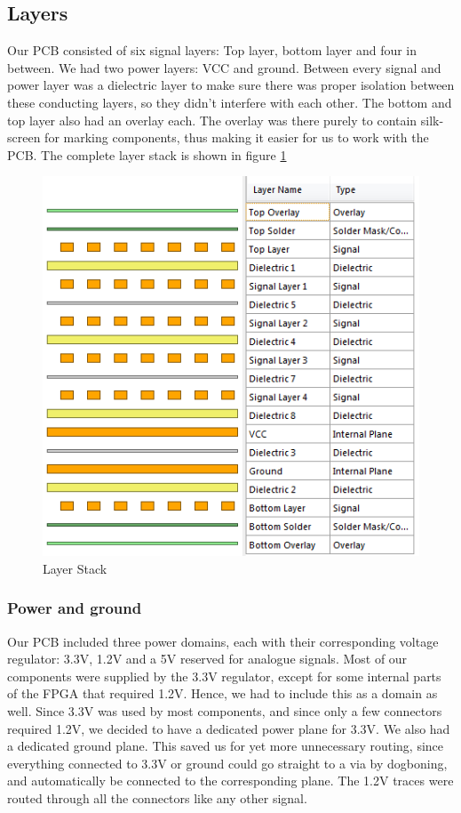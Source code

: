 \subsection{Layers}
Our PCB consisted of six signal layers: Top layer, bottom layer and four in between. We had two power layers: VCC and ground.
\newline
Between every signal and power layer was a dielectric layer to make sure there was proper isolation between these conducting layers, so they didn't interfere with each other.
\newline
The bottom and top layer also had an overlay each. The overlay was there purely to contain silk-screen for marking components, thus making it easier for us to work with the PCB.
\newline
The complete layer stack is shown in figure \ref{fig:Layers}

\begin{figure}[h!]
\centering
\includegraphics[scale = 0.8]{images/Layers.png}
\caption{Layer Stack}
\label{fig:Layers}
\end{figure}

\subsubsection{Power and ground}
Our PCB included three power domains, each with their corresponding voltage regulator: 3.3V, 1.2V and a 5V reserved for analogue signals. Most of our components were supplied by the 3.3V regulator, except for some internal parts of the FPGA that required 1.2V. Hence, we had to include this as a domain as well. 
\newline
\newline
Since 3.3V was used by most components, and since only a few connectors required 1.2V, we decided to have a dedicated power plane for 3.3V. We also had a dedicated ground plane. This saved us for yet more unnecessary routing, since everything connected to 3.3V or ground could go straight to a via by dogboning, and automatically be connected to the corresponding plane. The 1.2V traces were routed through all the connectors like any other signal. 

